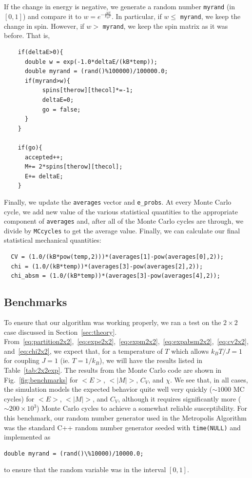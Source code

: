 \documentclass[12pt]{article}
\numberwithin{equation}{section}
\begin{document}
\par If the change in energy is negative, we generate a random number \texttt{myrand} (in $[0,1]$) and compare it to $w=e^{-\frac{\Delta E}{k_{B}T}}$.  In particular, if $w \leq$ \texttt{myrand}, we keep the change in spin.  However, if $w >$ \texttt{myrand}, we keep the spin matrix as it was before.  That is, 
\begin{verbatim}
    if(deltaE>0){
      double w = exp(-1.0*deltaE/(kB*temp));
      double myrand = (rand()%100000)/100000.0;  
      if(myrand>w){
           spins[therow][thecol]*=-1;
           deltaE=0;
           go = false;
      }
    }

    if(go){
      accepted++;
      M+= 2*spins[therow][thecol];
      E+= deltaE;
    }  
\end{verbatim}
\par Finally, we update the \texttt{averages} vector and \texttt{e\_probs}.  At every Monte Carlo cycle, we add new value of the various statistical quantities to the appropriate component of \texttt{averages} and, after all of the Monte Carlo cycles are through, we divide by \texttt{MCcycles} to get the average value.  Finally, we can calculate our final statistical mechanical quantities:
\begin{verbatim}
  CV = (1.0/(kB*pow(temp,2)))*(averages[1]-pow(averages[0],2));
  chi = (1.0/(kB*temp))*(averages[3]-pow(averages[2],2));
  chi_absm = (1.0/(kB*temp))*(averages[3]-pow(averages[4],2));
\end{verbatim}

\subsection{Benchmarks}
\label{subsec:benchmarks}

To ensure that our algorithm was working properly, we ran a test on the $2\times2$ case discussed in Section~\ref{sec:theory}.  From~\eqref{eq:partition2x2},~\eqref{eq:expe2x2},~\eqref{eq:expm2x2},~\eqref{eq:expabsm2x2},~\eqref{eq:cv2x2}, and~\eqref{eq:chi2x2}, we expect that, for a temperature of $T$ which allows $k_{B}T/J=1$ for coupling $J=1$ (ie. $T=1/k_{B}$), we will have the results listed in Table~\ref{tab:2x2exp}.  The results from the Monte Carlo code are shown in Fig.~\ref{fig:benchmarks} for $<E>$, $<|M|>$, $C_{V}$, and $\chi$.  We see that, in all cases, the simulation models the expected behavior quite well very quickly ($\sim1000$ MC cycles) for $<E>$, $<|M|>$, and $C_{V}$, although it requires significantly more ($\sim200\times10^{3}$) Monte Carlo cycles to achieve a somewhat reliable susceptibility.  For this benchmark, our random number generator used in the Metropolis Algorithm was the standard C++ random number generator seeded with \texttt{time(NULL)} and implemented as
\begin{verbatim}
double myrand = (rand()\%10000)/10000.0;
\end{verbatim}
to ensure that the random variable was in the interval $[0,1]$.
\end{document}
